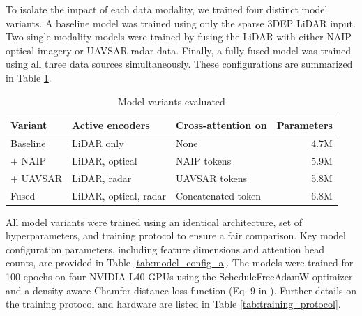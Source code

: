 \documentclass[preprints,article,accept,pdftex,moreauthors]{Definitions/mdpi}
\begin{document}
To isolate the impact of each data modality, we trained four distinct model variants. A baseline model was trained using only the sparse 3DEP LiDAR input. Two single-modality models were trained by fusing the LiDAR with either NAIP optical imagery or UAVSAR radar data. Finally, a fully fused model was trained using all three data sources simultaneously. These configurations are summarized in Table \ref{tab:model_variants}.
\begin{table}[htbp]
  \centering
  \caption{Model variants evaluated}
  \label{tab:model_variants}
  \begin{tabular}{lllr}
  \toprule
  \textbf{Variant} & \textbf{Active encoders} & \textbf{Cross-attention on} & \textbf{Parameters} \\
  \midrule
 Baseline & LiDAR only & None  & 4.7M \\
  + NAIP & LiDAR, optical  & NAIP tokens & 5.9M \\
  + UAVSAR & LiDAR, radar & UAVSAR tokens  & 5.8M \\
  Fused  & LiDAR, optical, radar & Concatenated token  & 6.8M \\
  \bottomrule
  \end{tabular}
\end{table}

All model variants were trained using an identical architecture, set of hyperparameters, and training protocol to ensure a fair comparison. Key model configuration parameters, including feature dimensions and attention head counts, are provided in Table \ref{tab:model_config_a}. The models were trained for 100 epochs on four NVIDIA L40 GPUs using the ScheduleFreeAdamW optimizer \cite{defazio_road_2024} and a density-aware Chamfer distance loss function (Eq. 9 in \cite{wu_density-aware_2021}). Further details on the training protocol and hardware are listed in Table \ref{tab:training_protocol}.
\end{document}
